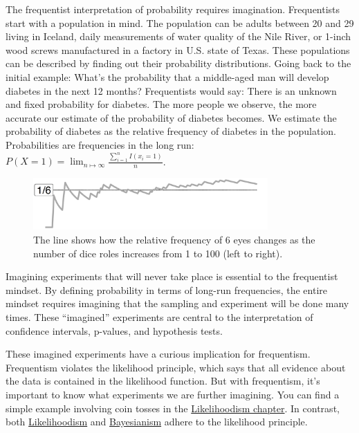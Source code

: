 \documentclass[
  10pt,
]{scrbook}
\begin{document}
The frequentist interpretation of probability requires imagination.
Frequentists start with a population in mind.
The population can be adults between 20 and 29 living in Iceland, daily measurements of water quality of the Nile River, or 1-inch wood screws manufactured in a factory in U.S. state of Texas.
These populations can be described by finding out their probability distributions.
Going back to the initial example:
What's the probability that a middle-aged man will develop diabetes in the next 12 months?
Frequentists would say: There is an unknown and fixed probability for diabetes.
The more people we observe, the more accurate our estimate of the probability of diabetes becomes.
We estimate the probability of diabetes as the relative frequency of diabetes in the population.
Probabilities are frequencies in the long run: \(P(X=1) = \lim_{n \mapsto \infty} \frac{\sum_{i=1}^{n} I(x_i = 1)}{n}\).

\begin{figure}

{\centering \includegraphics[width=0.8\textwidth]{figures/dice-1} 

}

\caption{The line shows how the relative frequency of 6 eyes changes as the number of dice roles increases from 1 to 100 (left to right).}\label{fig:dice}
\end{figure}

Imagining experiments that will never take place is essential to the frequentist mindset.
By defining probability in terms of long-run frequencies, the entire mindset requires imagining that the sampling and experiment will be done many times.
These ``imagined'' experiments are central to the interpretation of confidence intervals, p-values, and hypothesis tests.

These imagined experiments have a curious implication for frequentism.
Frequentism violates the likelihood principle, which says that all evidence about the data is contained in the likelihood function.
But with frequentism, it's important to know what experiments we are further imagining.
You can find a simple example involving coin tosses in the \protect\hyperlink{likelihoodism}{Likelihoodism chapter}.
In contrast, both \protect\hyperlink{likelihoodism}{Likelihoodism} and \protect\hyperlink{bayesianism}{Bayesianism} adhere to the likelihood principle.
\end{document}
